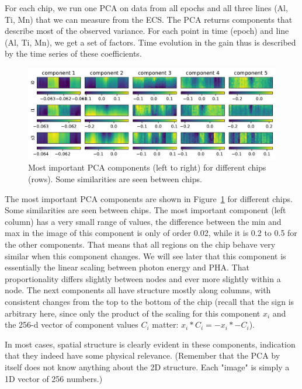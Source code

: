 \documentclass[]{spie}  %
\begin{document}
For each chip, we run one PCA on data from all epochs and all three lines (Al, Ti, Mn) that we can measure from the ECS. The PCA returns components that describe most of the observed variance. For each point in time (epoch) and line (Al, Ti, Mn), we get a set of factors. Time evolution in the gain thus is described by the time series of these coefficients.

\begin{figure} [ht]
  \begin{center}
    \includegraphics[width=\textwidth]{figures/components.pdf}
  \end{center}
  \caption
      {Most important PCA components (left to right) for different chips (rows). Some similarities are seen between chips. \label{fig:components}}
\end{figure}

The most important PCA components are shown in Figure~\ref{fig:components} for different chips. Some similarities are seen between chips. The most important component (left column) has a very small range of values, the difference between the min and max in the image of this component is only of order 0.02, while it is 0.2 to 0.5 for the other components. That means that all regions on the chip behave very similar when this component changes. We will see later that this component is essentially the linear scaling between photon energy and PHA. That proportionality differs slightly between nodes and ever more slightly within a node. The next components all have structure mostly along columns, with consistent changes from the top to the bottom of the chip
(recall that the sign is arbitrary here, since only the product of the scaling for this component $x_i$ and the 256-d vector of component values $C_i$ matter: $x_i * C_i = -x_i * -C_i$).

In most cases, spatial structure is clearly evident in these components, indication that they indeed have some physical relevance. (Remember that the PCA by itself does not know anything about the 2D structure. Each "image" is simply a 1D vector of 256 numbers.)
\end{document}
